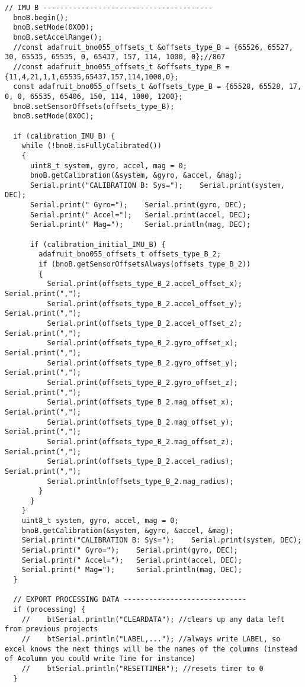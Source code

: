 \begin{lstlisting}[style=codearduino]
  // IMU B ----------------------------------------
  bnoB.begin();
  bnoB.setMode(0X00);
  bnoB.setAccelRange();
  //const adafruit_bno055_offsets_t &offsets_type_B = {65526, 65527, 30, 65535, 65535, 0, 65437, 157, 114, 1000, 0};//867
  //const adafruit_bno055_offsets_t &offsets_type_B = {11,4,21,1,1,65535,65437,157,114,1000,0};
  const adafruit_bno055_offsets_t &offsets_type_B = {65528, 65528, 17, 0, 0, 65535, 65406, 150, 114, 1000, 1200};
  bnoB.setSensorOffsets(offsets_type_B);
  bnoB.setMode(0X0C);

  if (calibration_IMU_B) {
    while (!bnoB.isFullyCalibrated())
    {
      uint8_t system, gyro, accel, mag = 0;
      bnoB.getCalibration(&system, &gyro, &accel, &mag);
      Serial.print("CALIBRATION B: Sys=");    Serial.print(system, DEC);
      Serial.print(" Gyro=");    Serial.print(gyro, DEC);
      Serial.print(" Accel=");   Serial.print(accel, DEC);
      Serial.print(" Mag=");     Serial.println(mag, DEC);

      if (calibration_initial_IMU_B) {
        adafruit_bno055_offsets_t offsets_type_B_2;
        if (bnoB.getSensorOffsetsAlways(offsets_type_B_2))
        {
          Serial.print(offsets_type_B_2.accel_offset_x);    Serial.print(",");
          Serial.print(offsets_type_B_2.accel_offset_y);    Serial.print(",");
          Serial.print(offsets_type_B_2.accel_offset_z);    Serial.print(",");
          Serial.print(offsets_type_B_2.gyro_offset_x);    Serial.print(",");
          Serial.print(offsets_type_B_2.gyro_offset_y);    Serial.print(",");
          Serial.print(offsets_type_B_2.gyro_offset_z);    Serial.print(",");
          Serial.print(offsets_type_B_2.mag_offset_x);    Serial.print(",");
          Serial.print(offsets_type_B_2.mag_offset_y);    Serial.print(",");
          Serial.print(offsets_type_B_2.mag_offset_z);    Serial.print(",");
          Serial.print(offsets_type_B_2.accel_radius);    Serial.print(",");
          Serial.println(offsets_type_B_2.mag_radius);
        }
      }
    }
    uint8_t system, gyro, accel, mag = 0;
    bnoB.getCalibration(&system, &gyro, &accel, &mag);
    Serial.print("CALIBRATION B: Sys=");    Serial.print(system, DEC);
    Serial.print(" Gyro=");    Serial.print(gyro, DEC);
    Serial.print(" Accel=");   Serial.print(accel, DEC);
    Serial.print(" Mag=");     Serial.println(mag, DEC);
  }

  // EXPORT PROCESSING DATA -----------------------------
  if (processing) {
    //    btSerial.println("CLEARDATA"); //clears up any data left from previous projects
    //    btSerial.println("LABEL,..."); //always write LABEL, so excel knows the next things will be the names of the columns (instead of Acolumn you could write Time for instance)
    //    btSerial.println("RESETTIMER"); //resets timer to 0
  }


\end{lstlisting}
